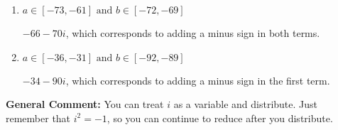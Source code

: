 \documentclass{extbook}[14pt]
\begin{document}
\begin{enumerate}
{\begin{enumerate}[label=\Alph*.]
 $-34 + 90 i$, which corresponds to adding a minus sign in the second term.
\item \( a \in [-73, -61] \text{ and } b \in [-72, -69] \)

 $-66 - 70 i$, which corresponds to adding a minus sign in both terms.
\item \( a \in [-36, -31] \text{ and } b \in [-92, -89] \)

 $-34 - 90 i$, which corresponds to adding a minus sign in the first term.
\end{enumerate}

\textbf{General Comment:} You can treat $i$ as a variable and distribute. Just remember that $i^2=-1$, so you can continue to reduce after you distribute.
}
\end{enumerate}
\end{document}
